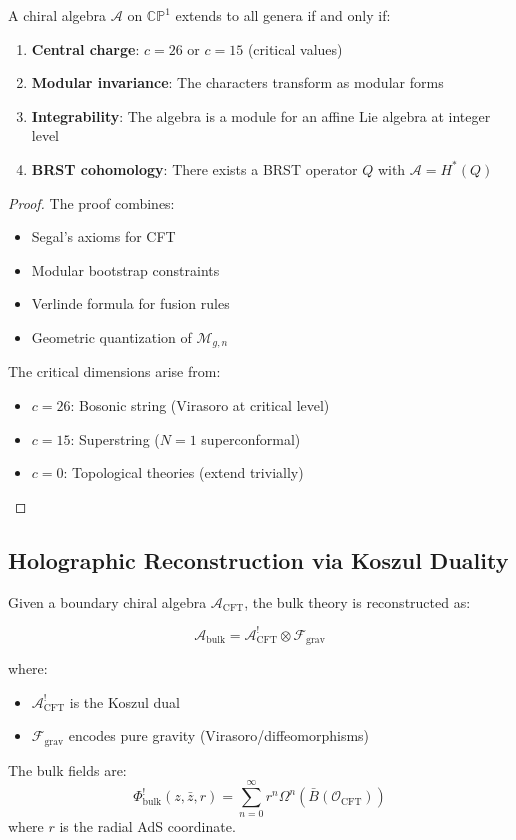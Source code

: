 \begin{theorem}
A chiral algebra $\mathcal{A}$ on $\mathbb{CP}^1$ extends to all genera if and only if:
\begin{enumerate}
\item \textbf{Central charge}: $c = 26$ or $c = 15$ (critical values)
\item \textbf{Modular invariance}: The characters transform as modular forms
\item \textbf{Integrability}: The algebra is a module for an affine Lie algebra at integer level
\item \textbf{BRST cohomology}: There exists a BRST operator $Q$ with $\mathcal{A} = H^*(Q)$
\end{enumerate}
\end{theorem}

\begin{proof}
The proof combines:
\begin{itemize}
\item Segal's axioms for CFT
\item Modular bootstrap constraints
\item Verlinde formula for fusion rules
\item Geometric quantization of $\mathcal{M}_{g,n}$
\end{itemize}

The critical dimensions arise from:
\begin{itemize}
\item $c = 26$: Bosonic string (Virasoro at critical level)
\item $c = 15$: Superstring ($N=1$ superconformal)
\item $c = 0$: Topological theories (extend trivially)
\end{itemize}
\end{proof}

\subsection{Holographic Reconstruction via Koszul Duality}

\begin{theorem}
Given a boundary chiral algebra $\mathcal{A}_{\text{CFT}}$, the bulk theory is reconstructed as:

$$\mathcal{A}_{\text{bulk}} = \mathcal{A}_{\text{CFT}}^! \otimes \mathcal{F}_{\text{grav}}$$

where:
\begin{itemize}
\item $\mathcal{A}_{\text{CFT}}^!$ is the Koszul dual
\item $\mathcal{F}_{\text{grav}}$ encodes pure gravity (Virasoro/diffeomorphisms)
\end{itemize}

The bulk fields are:
$$\Phi^!_{\text{bulk}}(z, \bar{z}, r) = \sum_{n=0}^\infty r^n \Omega^n(\bar{B}(\mathcal{O}_{\text{CFT}}))$$
where $r$ is the radial AdS coordinate.
\end{theorem}

